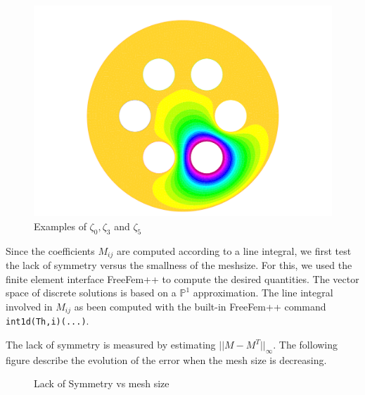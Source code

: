 \begin{figure}[!h]
  \includegraphics[scale=0.20]{fig/sol_5.pdf}
  \caption{Examples of $\zeta_0,\zeta_3$ and $\zeta_5$}
\label{fig:zetafamily}
\end{figure}


Since the coefficients $M_{ij}$ are computed according to a line integral, we first test the lack of symmetry versus the smallness  of the meshsize. For this, we used the finite element interface FreeFem++ to compute the desired quantities. The vector space of discrete solutions is based on a $\mathbb{P}^1$ approximation. The line integral involved in $M_{ij}$ as been computed with the built-in FreeFem++ command \texttt{int1d(Th,i)(...)}. 

The lack of symmetry is measured by estimating $|| M-M^T ||_\infty$. The following figure describe the evolution of the error when the mesh size is decreasing.
\begin{figure}[h]
  \centering
  \caption{Lack of Symmetry vs mesh size}
\label{fig:symm}
\end{figure}


